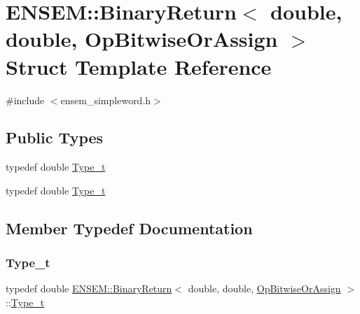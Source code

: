 \hypertarget{structENSEM_1_1BinaryReturn_3_01double_00_01double_00_01OpBitwiseOrAssign_01_4}{}\section{E\+N\+S\+EM\+:\+:Binary\+Return$<$ double, double, Op\+Bitwise\+Or\+Assign $>$ Struct Template Reference}
\label{structENSEM_1_1BinaryReturn_3_01double_00_01double_00_01OpBitwiseOrAssign_01_4}


{\ttfamily \#include $<$ensem\+\_\+simpleword.\+h$>$}

\subsection*{Public Types}
\begin{DoxyCompactItemize}
\item 
typedef double \mbox{\hyperlink{structENSEM_1_1BinaryReturn_3_01double_00_01double_00_01OpBitwiseOrAssign_01_4_a28cf6b687041196193aa5c2f774eb33b}{Type\+\_\+t}}
\item 
typedef double \mbox{\hyperlink{structENSEM_1_1BinaryReturn_3_01double_00_01double_00_01OpBitwiseOrAssign_01_4_a28cf6b687041196193aa5c2f774eb33b}{Type\+\_\+t}}
\end{DoxyCompactItemize}


\subsection{Member Typedef Documentation}
\mbox{\label{structENSEM_1_1BinaryReturn_3_01double_00_01double_00_01OpBitwiseOrAssign_01_4_a28cf6b687041196193aa5c2f774eb33b}} 
\subsubsection{\texorpdfstring{Type\_t}{Type\_t}\hspace{0.1cm}{\footnotesize\ttfamily [1/2]}}
{\footnotesize\ttfamily typedef double \mbox{\hyperlink{structENSEM_1_1BinaryReturn}{E\+N\+S\+E\+M\+::\+Binary\+Return}}$<$ double, double, \mbox{\hyperlink{structENSEM_1_1OpBitwiseOrAssign}{Op\+Bitwise\+Or\+Assign}} $>$\+::\mbox{\hyperlink{structENSEM_1_1BinaryReturn_3_01double_00_01double_00_01OpBitwiseOrAssign_01_4_a28cf6b687041196193aa5c2f774eb33b}{Type\+\_\+t}}}

